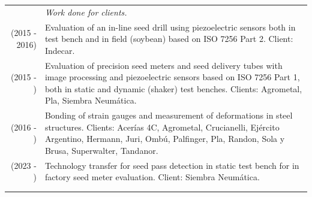 \documentclass[a4paper,10pt, sans]{article}
\begin{document}
  
  \begin{table}[H]
  \centering
  \begin{tabularx}{\textwidth}{r X}  
  		
        {} & \hspace{2cm} \textit{Work done for clients.} \\ [1ex]
        (2015 - 2016) & Evaluation of an in-line seed drill using piezoelectric sensors both in test bench and in field (soybean) based on ISO 7256 Part 2. Client: Indecar. \\  [1ex]

        (2015 - ) & Evaluation of precision seed meters and seed delivery tubes with image processing and piezoelectric sensors based on ISO 7256 Part 1, both in static and dynamic (shaker) test benches. Clients: Agrometal, Pla, Siembra Neumática. \\ [1ex]
        (2016 - ) & Bonding of strain gauges and measurement of deformations in steel structures. Clients: Acerías 4C, Agrometal, Crucianelli, Ejército Argentino, Hermann, Juri, Ombú, Palfinger, Pla, Randon, Sola y Brusa, Superwalter, Tandanor. \\ 
        (2023 - ) & Technology transfer for seed pass detection in static test bench for in factory seed meter evaluation. Client: Siembra Neumática.\\ \\ \hline \\





\end{tabularx}
\end{table}
\end{document}
